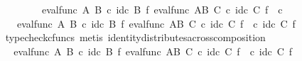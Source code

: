 \begin{isabellebody}
\ \ \ \ \ \ \isamarkupfalse%
\ {\isacharminus}{\kern0pt}\ \isanewline
\ \ \ \ \ \ \ \ \isamarkupfalse%
\ {\isachardoublequoteopen}eval{\isacharunderscore}{\kern0pt}func\ A\ B\ {\isasymcirc}\isactrlsub c\ id\isactrlsub c\ B\ {\isasymtimes}\isactrlsub f\ {\isacharparenleft}{\kern0pt}eval{\isacharunderscore}{\kern0pt}func\ {\isacharparenleft}{\kern0pt}A\isactrlbsup B\isactrlesup {\isacharparenright}{\kern0pt}\ C\ {\isasymcirc}\isactrlsub c\ {\isacharparenleft}{\kern0pt}id\isactrlsub c\ C\ {\isasymtimes}\isactrlsub f\ {\isasymphi}\isactrlsup {\isasymsharp}\isactrlsup {\isasymsharp}\ {\isasymcirc}\isactrlsub c\ {\isasympsi}\isactrlsup {\isasymsharp}{\isacharparenright}{\kern0pt}{\isacharparenright}{\kern0pt}\ {\isacharequal}{\kern0pt}\isanewline
\ \ \ \ \ \ \ \ \ \ \ \ \ \ eval{\isacharunderscore}{\kern0pt}func\ A\ B\ {\isasymcirc}\isactrlsub c\ id\isactrlsub c\ B\ {\isasymtimes}\isactrlsub f\ {\isacharparenleft}{\kern0pt}eval{\isacharunderscore}{\kern0pt}func\ {\isacharparenleft}{\kern0pt}A\isactrlbsup B\isactrlesup {\isacharparenright}{\kern0pt}\ C\ {\isasymcirc}\isactrlsub c\ {\isacharparenleft}{\kern0pt}id\isactrlsub c\ C\ {\isasymtimes}\isactrlsub f\ {\isasymphi}\isactrlsup {\isasymsharp}\isactrlsup {\isasymsharp}{\isacharparenright}{\kern0pt}\ {\isasymcirc}\isactrlsub c\ {\isacharparenleft}{\kern0pt}id\isactrlsub c\ C\ {\isasymtimes}\isactrlsub f\ {\isasympsi}\isactrlsup {\isasymsharp}{\isacharparenright}{\kern0pt}{\isacharparenright}{\kern0pt}{\isachardoublequoteclose}\isanewline
\ \ \ \ \ \ \ \ \ \ \isamarkupfalse%
\ {\isacharparenleft}{\kern0pt}typecheck{\isacharunderscore}{\kern0pt}cfuncs{\isacharcomma}{\kern0pt}\ metis\ identity{\isacharunderscore}{\kern0pt}distributes{\isacharunderscore}{\kern0pt}across{\isacharunderscore}{\kern0pt}composition{\isacharparenright}{\kern0pt}\isanewline
\ \ \ \ \ \ \ \ \isamarkupfalse%
\ \isamarkupfalse%
\ {\isachardoublequoteopen}{\isachardot}{\kern0pt}{\isachardot}{\kern0pt}{\isachardot}{\kern0pt}\ {\isacharequal}{\kern0pt}\ eval{\isacharunderscore}{\kern0pt}func\ A\ B\ {\isasymcirc}\isactrlsub c\ id\isactrlsub c\ B\ {\isasymtimes}\isactrlsub f\ {\isacharparenleft}{\kern0pt}{\isacharparenleft}{\kern0pt}eval{\isacharunderscore}{\kern0pt}func\ {\isacharparenleft}{\kern0pt}A\isactrlbsup B\isactrlesup {\isacharparenright}{\kern0pt}\ C\ {\isasymcirc}\isactrlsub c\ {\isacharparenleft}{\kern0pt}id\isactrlsub c\ C\ {\isasymtimes}\isactrlsub f\ {\isasymphi}\isactrlsup {\isasymsharp}\isactrlsup {\isasymsharp}{\isacharparenright}{\kern0pt}{\isacharparenright}{\kern0pt}\ {\isasymcirc}\isactrlsub c\ {\isacharparenleft}{\kern0pt}id\isactrlsub c\ C\ {\isasymtimes}\isactrlsub f\ {\isasympsi}\isactrlsup {\isasymsharp}{\isacharparenright}{\kern0pt}{\isacharparenright}{\kern0pt}{\isachardoublequoteclose}\isanewline

\end{isabellebody}
